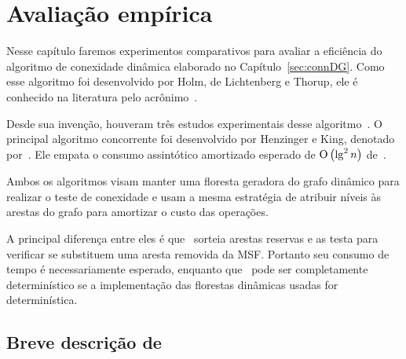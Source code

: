 \chapter{Avaliação empírica}
\label{sec:avaliacao-empirica}

Nesse capítulo faremos experimentos comparativos para avaliar a eficiência do algoritmo de conexidade dinâmica elaborado no Capítulo~\ref{sec:connDG}. Como esse algoritmo foi desenvolvido  por Holm, de Lichtenberg e Thorup, ele é conhecido na literatura pelo acrônimo~\HDT.

Desde sua invenção, houveram três estudos experimentais desse algoritmo~\cite{EmpiricalStudy1997, EmpiricalStudy2002, Zaroliagis2002}.
O principal algoritmo concorrente foi desenvolvido por Henzinger e King, denotado por~\HK.
Ele empata o consumo assintótico amortizado esperado de $\text{O}\left(\lg^2 n\right)$ de~\HDT.

Ambos os algoritmos visam manter uma floresta geradora do grafo dinâmico para realizar o teste de conexidade e usam a mesma estratégia de atribuir níveis às arestas do grafo para amortizar o custo das operações.

A principal diferença entre eles é que~\HK{} sorteia arestas reservas e as testa para verificar se substituem uma aresta removida da MSF. Portanto seu consumo de tempo é necessariamente esperado, enquanto que~\HDT{} pode ser completamente determinístico se a implementação das florestas dinâmicas usadas for determinística. 



\section{Breve descrição de~\CLHB{}}


